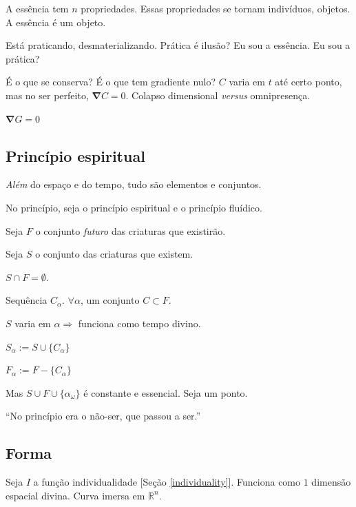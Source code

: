 \documentclass[12pt,a4paper]{article}
\begin{document}
			A ess\^encia tem $n$ propriedades. Essas propriedades se tornam indiv\'iduos, objetos. A ess\^encia \'e um objeto.

			Est\'a praticando, desmaterializando. Pr\'atica \'e ilus\~ao? Eu sou a ess\^encia. Eu sou a pr\'atica?

			\'E o que se conserva? \'E o que tem gradiente nulo? $C$ varia em $t$ at\'e certo ponto, mas no ser perfeito, $\mathbf{\nabla} C = 0$. Colapso dimensional \emph{versus} omnipresen\c{c}a.

			$\mathbf{\nabla} G = 0$

		\subsection{Princ\'ipio espiritual}

			\begin{flushright}
			\end{flushright}

			\emph{Al\'em} do espa\c{c}o e do tempo, tudo s\~ao elementos e conjuntos.

			No princ\'ipio, seja o princ\'ipio espiritual e o princ\'ipio flu\'idico.

			Seja $F$ o conjunto \emph{futuro} das criaturas que existir\~ao.

			Seja $S$ o conjunto das criaturas que existem.

			$S \cap F = \emptyset$.

			Sequ\^encia $C_\alpha$. $\forall \alpha$, um conjunto $C \subset F$.

			$S$ varia em $\alpha \Rightarrow$ funciona como tempo divino.

			$S_\alpha := S \cup \{C_\alpha\}$

			$F_\alpha := F - \{C_\alpha\}$

			Mas $S \cup F \cup \{\alpha_\omega\}$ \'e constante e essencial. Seja um ponto.

			\textquotedblleft No princ\'ipio era o n\~ao-ser, que passou a ser.\textquotedblright

			\subsection{Forma}

			\begin{flushright}
			\end{flushright}

			Seja $I$ a fun\c{c}\~ao individualidade [Se\c{c}\~ao \ref{individuality}]. Funciona como $1$ dimens\~ao espacial divina. Curva imersa em $\mathbb{R}^n$.
\end{document}
